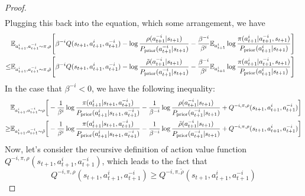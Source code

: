 \begin{proof}
\begin{equation*}
\begin{aligned}
\end{aligned}
\end{equation*}
Plugging this back into the equation, which some arrangement, we have 
\begin{equation*}
\begin{aligned}
&\begin{aligned}[t]
    \mathbb{E}_{a^i_{t+1}, a^{-i}_{t+1} \sim \pi, \rho}\Bigg[\beta^{-i}Q(s_{t+1}, a^i_{t+1}, a^{-i}_{t+1}) - \log\frac{\rho(a^{-i}_{t+1} | s_{t+1})}{P_{\text{prior}}(a^{-i}_{t+1} | s_{t+1})} - \frac{\beta^{-i}}{\beta^i} \mathbb{E}_{a^i_{t+1}}\log \frac{\pi(a^i_{t+1} | a^{-i}_{t+1}, s_{t+1})}{P_{\text{prior}}(a^i_{t+1} | s_{t+1})}\Bigg]
\end{aligned} \\
\le&\begin{aligned}[t]
    &\mathbb{E}_{a^i_{t+1}, a^{-i}_{t+1} \sim \pi, \tilde{\rho}}\Bigg[\beta^{-i}Q(s_{t+1}, a^i_{t+1}, a^{-i}_{t+1}) -\log\frac{\tilde{\rho}(a^{-i}_{t+1} | s_{t+1})}{P_{\text{prior}}(a^{-i}_{t+1} | s_{t+1})} - \frac{\beta^{-i}}{\beta^i} \mathbb{E}_{a^i_{t+1}}\log \frac{\pi(a^i_{t+1} | a^{-i}_{t+1}, s_{t+1})}{P_{\text{prior}}(a^i_{t+1} | s_{t+1})}\Bigg]
\end{aligned}
\end{aligned}
\end{equation*}
In the case that $\beta^{-i} < 0$, we have the following inequality:
\begin{equation*}
\begin{aligned}
    &\mathbb{E}_{a^i_{t+1}, a^{-i}_{t+1} \sim \rho}\bigg[-\frac{1}{\beta^i}\log \frac{\pi(a^i_{t+1} | s_{t+1}, a^{-i}_{t+1})}{P_{\text{prior}}(a^i_{t+1} | s_{t+1}, a^{-i}_{t+1})} - \frac{1}{\beta^{-i}}\log \frac{\rho(a^{-i}_{t+1} | s_{t+1})}{P_{\text{prior}}(a^{-i}_{t+1} | s_{t+1})} + Q^{-i, \pi, \rho}(s_{t+1}, a^i_{t+1}, a^{-i}_{t+1}) \bigg] \\
    \ge &\mathbb{E}_{a^i_{t+1}, a^{-i}_{t+1} \sim \tilde{\rho}}\bigg[-\frac{1}{\beta^i}\log \frac{\pi(a^i_{t+1} | s_{t+1}, a^{-i}_{t+1})}{P_{\text{prior}}(a^i_{t+1} | s_{t+1}, a^{-i}_{t+1})} - \frac{1}{\beta^{-i}}\log \frac{\tilde{\rho}(a^{-i}_{t+1} | s_{t+1})}{P_{\text{prior}}(a^{-i}_{t+1} | s_{t+1})} + Q^{-i, \pi, \rho}(s_{t+1}, a^i_{t+1}, a^{-i}_{t+1}) \bigg]
\end{aligned}
\end{equation*}
Now, let's consider the  recursive definition of action value function $Q^{-i, \pi, \rho}(s_{t+1}, a^i_{t+1}, a^{-i}_{t+1})$, which leads to the fact that 
\begin{equation}
    Q^{-i, \pi, \rho}(s_{t+1}, a^i_{t+1}, a^{-i}_{t+1}) \ge Q^{-i, \pi, \tilde{\rho}}(s_{t+1}, a^i_{t+1}, a^{-i}_{t+1})

\end{equation}
\end{proof}
